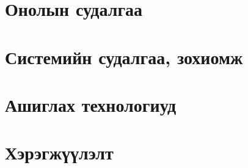 \chapter{Онолын судалгаа}

\chapter{Системийн судалгаа, зохиомж}

\chapter{Ашиглах технологиуд}

\chapter{Хэрэгжүүлэлт}

